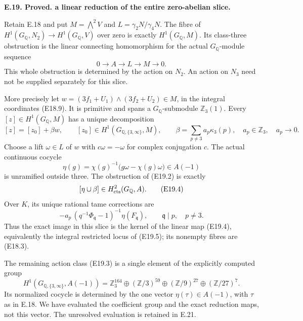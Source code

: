 \documentclass[11pt,oneside]{article}
\makeatletter
\newcounter{statementanchor}
\newenvironment{statement}[3]{%
 \refstepcounter{statementanchor}\def\@currentlabel{#1}%
 \par\addvspace{9pt}\noindent
 \textbf{#1. #2. #3.}\par\nobreak\noindent\ignorespaces
}{\par\addvspace{5pt}}
\makeatother
\begin{document}
\begin{statement}{E.19}{Proved}{a linear reduction of the entire zero-abelian slice}
\label{st:E.19}
\label{E-zero-slice}
Retain E.18 and put $M=\bigwedge^2V$ and
$L=\gamma_2N/\gamma_4N$. The fibre of
$H^1(G_{\mathbb Q},N_2)\to H^1(G_{\mathbb Q},V)$
over zero is exactly $H^1(G_{\mathbb Q},M)$.
Its class-three obstruction is the linear connecting
homomorphism for the actual $G_{\mathbb Q}$-module
sequence
\[
 0\longrightarrow A\longrightarrow L
       \longrightarrow M\longrightarrow0 .
 \tag{E19.1}
\]
This whole obstruction is determined by the action
on $N_2$. An action on $N_3$ need not be supplied
separately for this slice.

More precisely let
$w=(3f_1+U_1)\wedge(3f_2+U_2)\in M$,
in the integral coordinates (E18.9).
It is primitive and spans a $G_{\mathbb Q}$-submodule
$\mathbb Z_3(1)$. Every $[z]\in H^1(G_{\mathbb Q},M)$
has a unique decomposition
\[
 [z]=[z_0]+\beta w,\qquad
 [z_0]\in H^1(G_{\mathbb Q,\{3,\infty\}},M),
 \qquad \beta=\sum_{p\ne3}a_p\kappa_3(p),
 \quad a_p\in\mathbb Z_3,\quad a_p\to0.
 \tag{E19.2}
\]
Choose a lift $\omega\in L$ of $w$ with
$c\omega=-\omega$ for complex conjugation $c$.
The actual continuous cocycle
\[
 \eta(g)=\chi(g)^{-1}\bigl(g\omega-\chi(g)\omega\bigr)
       \in A(-1)
 \tag{E19.3}
\]
is unramified outside three. The obstruction of
(E19.2) is exactly
\[
                  [\eta\cup\beta]\in
                        H^2_{\rm cts}(G_{\mathbb Q},A).
 \tag{E19.4}
\]
Over $K$, its unique rational tame corrections are
\[
 -a_p\,(q^{-1}\Phi_{\mathfrak q}-1)^{-1}
                          \eta(F_{\mathfrak q}),
       \qquad \mathfrak q\mid p,\quad p\ne3.
 \tag{E19.5}
\]
Thus the exact image in this slice is the kernel
of the linear map (E19.4), equivalently the integral
restricted locus of (E19.5); its nonempty fibres
are (E18.3).

The remaining action class (E19.3) is a single
element of the explicitly computed group
\[
 H^1(G_{\mathbb Q,\{3,\infty\}},A(-1))
 =\mathbb Z_3^{164}\oplus(\mathbb Z/3)^{59}
       \oplus(\mathbb Z/9)^{27}\oplus(\mathbb Z/27)^7.
 \tag{E19.6}
\]
Its normalized cocycle is determined by the one
vector $\eta(\tau)\in A(-1)$, with $\tau$ as in
E.18. We have evaluated the coefficient group
and the exact reduction maps, not this vector.
The unresolved evaluation is retained in E.21.
\end{statement}
\end{document}
